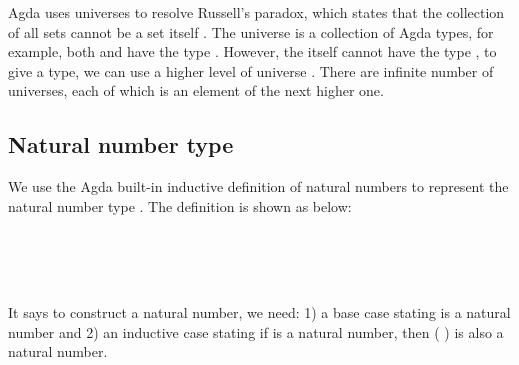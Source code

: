 \documentclass{l4proj}
\begin{document}
Agda uses universes to resolve Russell's paradox, which states that the collection of all sets cannot be a set itself \citep{agda-set}. The universe  is a collection of Agda types, for example, both  and  have the type . However, the  itself cannot have the type , to give  a type, we can use a higher level of universe \AgdaSpace{}. There are infinite number of universes, each of which is an element of the next higher one.

\subsection{Natural number type}
\label{datatype:naturals}
We use the Agda built-in inductive definition of natural numbers to represent the natural number type \citep{agda-stdlib}. The definition is shown as below:
\begin{code}%
\>[0]\<%
\\
\>[0]\AgdaSpace{}%
\AgdaSpace{}%
\AgdaSymbol{:}\AgdaSpace{}%
\AgdaSpace{}%
\<%
\\
\>[0][@{}l@{\AgdaIndent{0}}]%
\>[2]\AgdaSpace{}%
\AgdaSymbol{:}\AgdaSpace{}%
\<%
\\
%
\>[2]%
\>[7]\AgdaSymbol{:}\AgdaSpace{}%
\AgdaSymbol{(}\AgdaSpace{}%
\AgdaSymbol{:}\AgdaSpace{}%
\AgdaSymbol{)}\AgdaSpace{}%
\AgdaSpace{}%
\<%
\end{code}

It says to construct a natural number, we need: 1) a base case stating  is a natural number and 2) an inductive case stating if  is a natural number, then ( ) is also a natural number.
\end{document}
